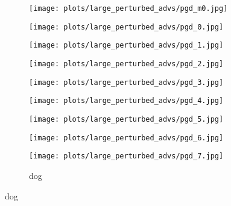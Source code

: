 \documentclass{article}
\begin{document}
\begin{figure}[t]
    \begin{subfigure}{0.8\linewidth}
    \centering
    \begin{minipage}[b]{0.10\linewidth}
        \texttt{[image: plots/large\_perturbed\_advs/pgd\_m0.jpg]}\vspace{-2mm}\caption{car}
    \end{minipage}
    \begin{minipage}[b]{0.10\linewidth}
        \texttt{[image: plots/large\_perturbed\_advs/pgd\_0.jpg]}\vspace{-2mm}\caption{dog}
    \end{minipage}
    \begin{minipage}[b]{0.10\linewidth}
        \texttt{[image: plots/large\_perturbed\_advs/pgd\_1.jpg]}\vspace{-2mm}\caption{cat}
    \end{minipage}
        \begin{minipage}[b]{0.10\linewidth}
        \texttt{[image: plots/large\_perturbed\_advs/pgd\_2.jpg]}\vspace{-2mm}\caption{deer}
    \end{minipage}
        \begin{minipage}[b]{0.10\linewidth}
        \texttt{[image: plots/large\_perturbed\_advs/pgd\_3.jpg]}\vspace{-2mm}\caption{cat}
    \end{minipage}
        \begin{minipage}[b]{0.10\linewidth}
        \texttt{[image: plots/large\_perturbed\_advs/pgd\_4.jpg]}\vspace{-2mm}\caption{frog}
    \end{minipage}
        \begin{minipage}[b]{0.10\linewidth}
        \texttt{[image: plots/large\_perturbed\_advs/pgd\_5.jpg]}\vspace{-2mm}\caption{bird}
    \end{minipage}
        \begin{minipage}[b]{0.10\linewidth}
        \texttt{[image: plots/large\_perturbed\_advs/pgd\_6.jpg]}\vspace{-2mm}\caption{frog}
    \end{minipage}
        \begin{minipage}[b]{0.10\linewidth}
        \texttt{[image: plots/large\_perturbed\_advs/pgd\_7.jpg]}\vspace{-2mm}\caption{dog}
    \end{minipage}
    \end{subfigure}


\end{figure}
\end{document}
